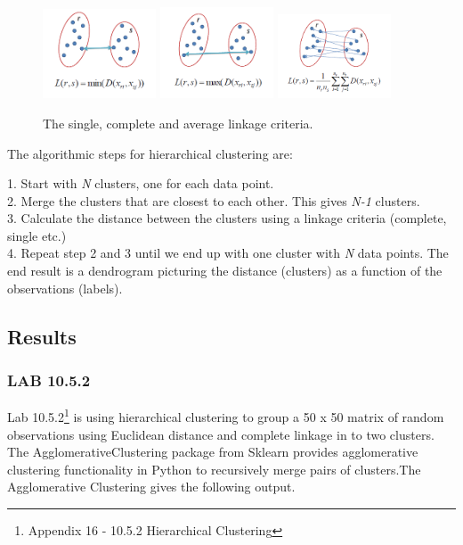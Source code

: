 \begin{figure}[H]
	\centering
	\includegraphics[width=0.3\textwidth]{clusteringMethods/hierarchicalclustering/fig/ClusteringSingle.png}
	\includegraphics[width=0.3\textwidth]{clusteringMethods/hierarchicalclustering/fig/ClusteringComplete.png}
	\includegraphics[width=0.3\textwidth]{clusteringMethods/hierarchicalclustering/fig/ClusteringAverage.png}
	\caption{The single, complete and average linkage criteria.}
	\label{fig:linkagecriteria}
\end{figure}

The algorithmic steps for hierarchical clustering are:

1. Start with \textit{N} clusters, one for each data point. \\
2. Merge the clusters that are closest to each other. This gives \textit{N-1} clusters. \\
3. Calculate the distance between the clusters using a linkage criteria (complete, single etc.) \\
4. Repeat step 2 and 3 until we end up with one cluster with \textit{N} data points. The end result is a dendrogram picturing the distance (clusters) as a function of the observations (labels).

\subsection{Results}
\subsubsection*{LAB 10.5.2}
Lab 10.5.2\footnote{Appendix 16 - 10.5.2 Hierarchical Clustering} is using hierarchical clustering to group a 50 x 50 matrix of random observations using Euclidean distance and complete linkage in to two clusters. The AgglomerativeClustering package from Sklearn provides agglomerative clustering functionality in Python to recursively merge pairs of clusters.The Agglomerative Clustering gives the following output.

